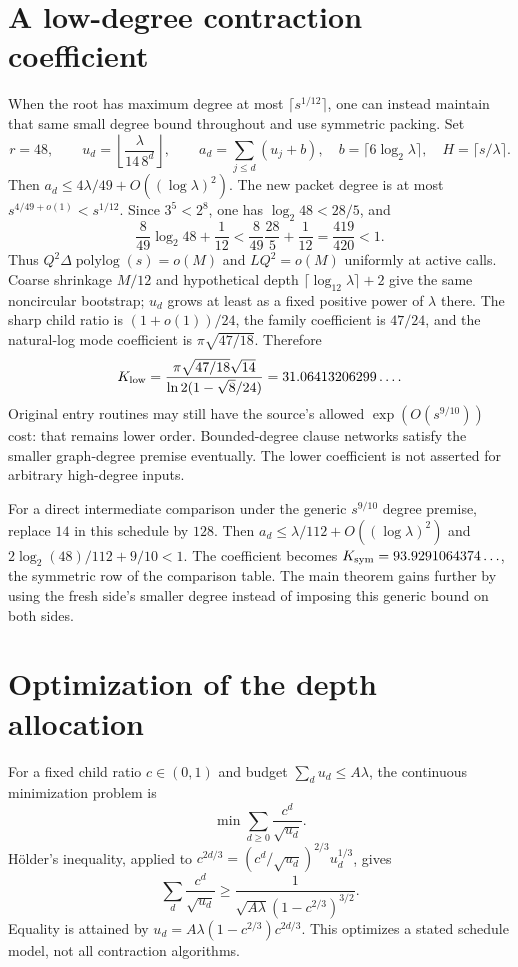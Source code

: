 \documentclass[11pt,letterpaper]{article}
\theoremstyle{remark}\newtheorem{remark}[theorem]{Remark}
\newcommand{\polylog}{\operatorname{polylog}}
\begin{document}
\section{A low-degree contraction coefficient}
\label{app:lowdegree}
When the root has maximum degree at most $\lceil s^{1/12}\rceil$,
one can instead maintain that same small degree bound throughout and
use symmetric packing. Set
\[
 r=48,\qquad u_d=\left\lfloor\frac{\lambda}{14\,8^d}\right\rfloor,
 \qquad a_d=\sum_{j\le d}(u_j+b),\quad
 b=\lceil6\log_2\lambda\rceil,\quad H=\lceil s/\lambda\rceil.
\]
Then $a_d\le4\lambda/49+O((\log\lambda)^2)$.
The new packet degree is at most $s^{4/49+o(1)}<s^{1/12}$.
Since $3^5<2^8$, one has $\log_2 48<28/5$, and
\[
 \frac8{49}\log_2 48+\frac1{12}
 <\frac8{49}\frac{28}{5}+\frac1{12}
 =\frac{419}{420}<1.
\]
Thus $Q^2\Delta\polylog(s)=o(M)$ and $LQ^2=o(M)$ uniformly at active
calls. Coarse shrinkage $M/12$ and hypothetical depth
$\lceil\log_{12}\lambda\rceil+2$ give the same noncircular bootstrap;
$u_d$ grows at least as a fixed positive power of $\lambda$ there.
The sharp child ratio is $(1+o(1))/24$, the family coefficient is
$47/24$, and the natural-log mode coefficient is
$\pi\sqrt{47/18}$. Therefore
\begin{equation}\label{eq:lowdegree-constant}
 K_{\rm low}=\frac{\pi\sqrt{47/18}\sqrt{14}}
 {\ln2(1-\sqrt8/24)}=31.06413206299\ldots .
\end{equation}
Original entry routines may still have the source's allowed
$\exp(O(s^{9/10}))$ cost: that remains lower order. Bounded-degree
clause networks satisfy the smaller graph-degree premise eventually.
The lower coefficient is not asserted for arbitrary high-degree inputs.

For a direct intermediate comparison under the generic $s^{9/10}$
degree premise, replace $14$ in this schedule by $128$. Then
$a_d\le\lambda/112+O((\log\lambda)^2)$ and
$2\log_2(48)/112+9/10<1$. The coefficient becomes
$K_{\rm sym}=93.9291064374\ldots$, the symmetric row of the comparison
table. The main theorem gains further by using the fresh side's smaller
degree instead of imposing this generic bound on both sides.

\section{Optimization of the depth allocation}
\label{app:optimization}
For a fixed child ratio $c\in(0,1)$ and budget
$\sum_du_d\le A\lambda$, the continuous minimization problem is
\[
 \min\sum_{d\ge0}\frac{c^d}{\sqrt{u_d}}.
\]
H\"older's inequality, applied to
$c^{2d/3}=(c^d/\sqrt{u_d})^{2/3}u_d^{1/3}$, gives
\[
 \sum_d\frac{c^d}{\sqrt{u_d}}
 \ge\frac{1}{\sqrt{A\lambda}(1-c^{2/3})^{3/2}}.
\]
Equality is attained by
$u_d=A\lambda(1-c^{2/3})c^{2d/3}$.
This optimizes a stated schedule model, not all contraction algorithms.
\end{document}
